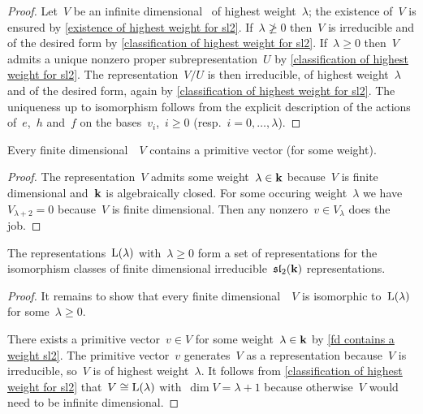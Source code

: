 \begin{proof}
  Let~$V$ be an infinite dimensional~{} of highest weight~$\lambda$;
  the existence of~$V$ is ensured by \cref{existence of highest weight for sl2}.
  If~$\lambda \ngeq 0$ then~$V$ is irreducible and of the desired form by \cref{classification of highest weight for sl2}.
  If~$\lambda \geq 0$ then~$V$ admits a unique nonzero proper subrepresentation~$U$ by \cref{classification of highest weight for sl2}.
  The representation~$V/U$ is then irreducible, of highest weight~$\lambda$ and of the desired form, again by \cref{classification of highest weight for sl2}.
  The uniqueness up to isomorphism follows from the explicit description of the actions of~$e$,~$h$ and~$f$ on the bases~$v_i$,~$i \geq 0$ (resp.~$i = 0, \dotsc, \lambda$).
\end{proof}


\begin{lemma}
  \label{fd contains a weight sl2}
  Every finite dimensional~{}~$V$ contains a primitive vector (for some weight).
\end{lemma}


\begin{proof}
  The representation~$V$ admits some weight~$\lambda \in \mathbf{k}$ because~$V$ is finite dimensional and~$\mathbf{k}$ is algebraically closed.
  For some occuring weight~$\lambda$ we have~$V_{\lambda+2} = 0$ because~$V$ is finite dimensional.
  Then any nonzero~$v \in V_\lambda$ does the job.
\end{proof}


\begin{corollary}
  The representations~$\operatorname{L}(\lambda)$ with~$\lambda \geq 0$ form a set of representations for the isomorphism classes of finite dimensional irreducible~$\mathfrak{sl}_2(\mathbf{k})$ representations.
\end{corollary}


\begin{proof}
  It remains to show that every finite dimensional~{}~$V$ is isomorphic to~$\operatorname{L}(\lambda)$ for some~$\lambda \geq 0$.
  
  There exists a primitive vector~$v \in V$ for some weight~$\lambda \in \mathbf{k}$ by \cref{fd contains a weight sl2}.
  The primitive vector~$v$ generates~$V$ as a representation because~$V$ is irreducible, so~$V$ is of highest weight~$\lambda$.
  It follows from \cref{classification of highest weight for sl2} that~$V \cong \operatorname{L}(\lambda)$ with~$\dim V = \lambda + 1$ because otherwise~$V$ would need to be infinite dimensional. 
\end{proof}

